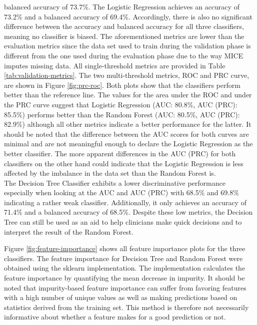 balanced accuracy of 73.7\%. The Logistic Regression achieves an accuracy of 
73.2\% and a balanced accuracy of 69.4\%. Accordingly, there is 
also no significant difference between the accuracy and balanced accuracy for 
all three classifiers, meaning no classifier is biased.
The aforementioned metrics are lower than the evaluation metrics since the data 
set used to train during the validation phase is different from the one used 
during the evaluation phase due to the way MICE imputes missing data.
All single-threshold metrics are provided in Table \ref{tab:validation-metrics}.
The two multi-threshold metrics, ROC and PRC curve, are shown in Figure 
\ref{fig:prc-roc}. Both plots show that the classifiers perform better than the 
reference line. The values for the area under the ROC and under the PRC curve 
suggest that Logistic Regression (AUC: 80.8\%, AUC (PRC): 85.5\%) performs 
better than the Random Forest (AUC: 80.5\%, AUC (PRC): 82.9\%) although all 
other metrics indicate a better performance for the latter. It 
should be noted that the difference between the AUC scores for both curves are 
minimal and are not meaningful enough to declare the Logistic Regression as the 
better classifier. The more apparent differences in the AUC (PRC) for both 
classifiers on the other hand could indicate that the Logistic Regression is 
less affected by the imbalance in the data set than the Random Forest is.
\\
The Decision Tree Classifier exhibits a lower discriminative performance
especially when looking at the AUC and AUC (PRC) with 68.5\% and 69.8\% 
indicating a rather weak classifier. Additionally, it only 
achieves an accuracy of 71.4\% and a balanced accuracy of 68.5\%. Despite 
these low metrics, the Decision Tree can still be used as an aid to 
help clinicians make quick decisions and to interpret the result of the Random 
Forest.
\par
Figure \ref{fig:feature-importance} shows all feature importance plots for the 
three classifiers. The feature importance for Decision Tree and Random Forest 
were obtained using the sklearn implementation. The implementation calculates 
the feature importance by quantifying the mean decrease in impurity. 
It should be noted that impurity-based feature importance can suffer 
from favoring features with a high number of unique values as well as making 
predictions based on statistics derived from the training set. This method is 
therefore not necessarily informative about whether a feature makes for a 
good prediction or not.\cite{RN178}
